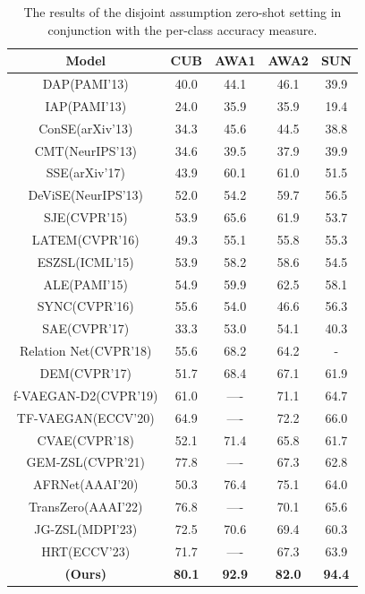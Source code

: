 \documentclass{article}
\begin{document}
\begin{table}[h]
  \footnotesize
  \begin{center}
  \label{tab:example11}
  \begin{tabular}{ccccc}
    \toprule
\textbf{Model}	& \textbf{CUB}	 & \textbf{AWA1} & \textbf{AWA2}   & \textbf{SUN}\\
    \midrule
DAP(PAMI'13) \cite{b17}		& 40.0			 	& 44.1	& 46.1& 39.9\\
IAP(PAMI'13) \cite{b17}			& 24.0			& 35.9	& 35.9 & 19.4\\
ConSE(arXiv'13) \cite{b22}		& 34.3		& 45.6	& 44.5&38.8\\
CMT(NeurIPS'13) \cite{b23}		& 34.6			& 39.5	& 37.9 & 39.9\\
SSE(arXiv'17) \cite{b65}		& 43.9		& 60.1	& 61.0 & 51.5\\
DeViSE(NeurIPS'13) \cite{b24}		& 52.0		& 54.2	& 59.7 & 56.5\\
SJE(CVPR'15) \cite{b25}		& 53.9		& 65.6	& 61.9 & 53.7\\
LATEM(CVPR'16) \cite{b26}		& 49.3		& 55.1	& 55.8 &55.3\\
ESZSL(ICML'15) \cite{b27}		& 53.9& 58.2	& 58.6 &54.5\\
ALE(PAMI'15)\cite{b1}		& 54.9		& 59.9	& 62.5 & 58.1\\
SYNC(CVPR'16) \cite{b3}		& 55.6	& 54.0	& 46.6 & 56.3\\
SAE(CVPR'17)\cite{b10}		& 33.3	& 53.0	& 54.1 & 40.3\\
Relation Net(CVPR'18)\cite{b32}		& 55.6	& 68.2	& 64.2 & -\\
DEM(CVPR'17)\cite{b28}		& 51.7		& 68.4	& 67.1& 61.9\\
f-VAEGAN-D2(CVPR'19)\cite{b46}		& 61.0	 & ----	& 71.1& 64.7\\
TF-VAEGAN(ECCV'20)\cite{b47}		& 64.9		& ---- 	& 72.2 & 66.0\\
CVAE(CVPR'18)\cite{b35}		& 52.1		 & 71.4	& 65.8& 61.7\\
GEM-ZSL(CVPR'21)\cite{b66} & 77.8		 & ----	& 67.3 & 62.8\\
AFRNet(AAAI'20)\cite{b67}& 50.3		 & 76.4	& 75.1 & 64.0\\
TransZero(AAAI'22)\cite{b77}& 76.8		 & ----	& 70.1 & 65.6\\
JG-ZSL(MDPI'23)\cite{b78}& 72.5		 & 70.6	& 69.4 & 60.3\\
HRT(ECCV'23)\cite{b79}& 71.7		 & ----	& 67.3 & 63.9\\
\bottomrule
\textbf{ (Ours) }		& \textbf{80.1}		 & \textbf{92.9}  	& \textbf{82.0} & \textbf{94.4}
  \end{tabular}
    \caption{The results of the disjoint assumption zero-shot setting in conjunction with the per-class accuracy measure.}
  \end{center}
\end{table}
\end{document}
